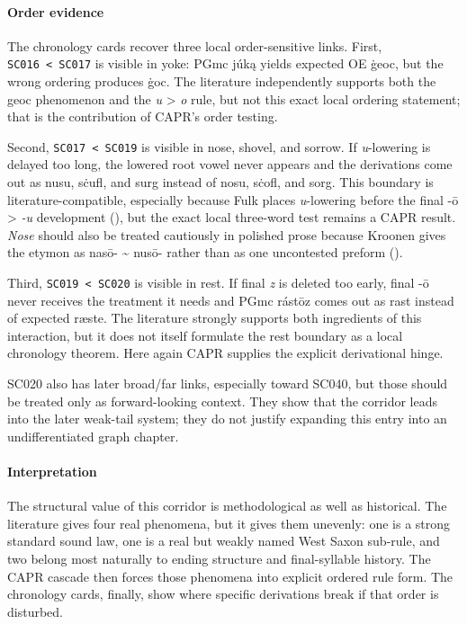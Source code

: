 \documentclass[
  british,
  a4paper,
]{article}
\begin{document}
\paragraph{Order evidence}\label{order-evidence-12}

The chronology cards recover three local order-sensitive links. First,
\texttt{SC016\ \textless{}\ SC017} is visible in yoke: PGmc júką yields
expected OE ġeoc, but the wrong ordering produces ġoc. The literature
independently supports both the geoc phenomenon and the \emph{u}
\textgreater{} \emph{o} rule, but not this exact local ordering
statement; that is the contribution of CAPR's order testing.

Second, \texttt{SC017\ \textless{}\ SC019} is visible in nose, shovel,
and sorrow. If \emph{u}-lowering is delayed too long, the lowered root
vowel never appears and the derivations come out as nusu, sċufl, and
surg instead of nosu, sċofl, and sorg. This boundary is
literature-compatible, especially because Fulk places \emph{u}-lowering
before the final -ō \textgreater{} \emph{-u} development
(), but the exact local
three-word test remains a CAPR result. \emph{Nose} should also be
treated cautiously in polished prose because Kroonen gives the etymon as
nasō- \textasciitilde{} nusō- rather than as one uncontested preform
().

Third, \texttt{SC019\ \textless{}\ SC020} is visible in rest. If final
\emph{z} is deleted too early, final -ō never receives the treatment it
needs and PGmc rástōz comes out as rast instead of expected ræste. The
literature strongly supports both ingredients of this interaction, but
it does not itself formulate the rest boundary as a local chronology
theorem. Here again CAPR supplies the explicit derivational hinge.

SC020 also has later broad/far links, especially toward SC040, but those
should be treated only as forward-looking context. They show that the
corridor leads into the later weak-tail system; they do not justify
expanding this entry into an undifferentiated graph chapter.

\paragraph{Interpretation}\label{interpretation-12}

The structural value of this corridor is methodological as well as
historical. The literature gives four real phenomena, but it gives them
unevenly: one is a strong standard sound law, one is a real but weakly
named West Saxon sub-rule, and two belong most naturally to ending
structure and final-syllable history. The CAPR cascade then forces those
phenomena into explicit ordered rule form. The chronology cards,
finally, show where specific derivations break if that order is
disturbed.
\end{document}
